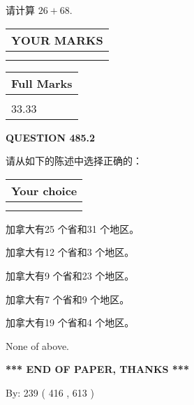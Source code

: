 \documentclass{ctexart}
\begin{document}
  
 
请计算 $ %
26 +  %
68 $.
 

 

 
  
\vspace{0.2in}
  
\noindent\begin{tabular}{|l|}
\hline
 YOUR MARKS  \\
\hline
 \\ 
 \\ 
\hline
\end{tabular}
\hspace{0.05in} \begin{tabular}{|l|}
\hline
 Full Marks  \\
\hline
 \\ 
33.33 \\
\hline
\end{tabular}
{\textbf{\Large{QUESTION
485.2 
}}}
  
  
请从如下的陈述中选择正确的：
  
  
\noindent\hspace{3.0in} \begin{tabular}{|l|}
\hline
Your choice \\
\hline
 \\ 
 \\ 
\hline
\end{tabular}
  
  
 
 
加拿大有25 个省和31 个地区。
 
 
加拿大有12 个省和3 个地区。
 
 
加拿大有9 个省和23 个地区。
 
 
加拿大有7 个省和9 个地区。
 
 
加拿大有19 个省和4 个地区。
 
 
 None of above.
 
 
   
   
 \vspace{0.2in}
 
   
   
   
   
\vspace{1.0in} 
{\textbf{\large{ *** END OF PAPER, THANKS *** }}} 
   
   
\hspace{1.0in} By: 
 239 ( 416 ,  613 )
   
\end{document}
